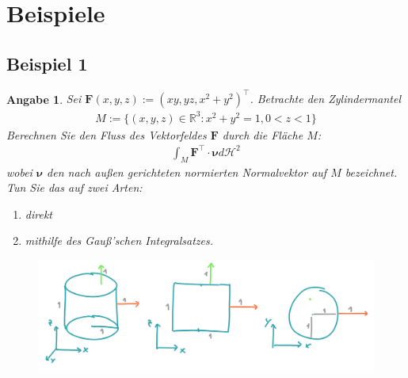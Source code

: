 \documentclass[]{article}
\newtheorem*{angabe*}{Angabe}
\begin{document}
\section{Beispiele}

\subsection*{Beispiel 1}
\begin{angabe*}
	Sei $\bm{F}(x,y,z) := (xy, yz, x^2+y^2)^\top$. Betrachte den Zylindermantel
	\begin{align*}
		M := \{(x,y,z) \in \mathbb{R}^3: x^2+y^2=1, 0<z<1\}
	\end{align*}
	Berechnen Sie den Fluss des Vektorfeldes $\mathbf{F}$ durch die Fläche $M$:
	\begin{align*}
		\int_M \bm{F}^\top \cdot \bm{\nu} d\mathcal{H}^2
	\end{align*}
	wobei $\bm{\nu}$ den nach außen gerichteten normierten Normalvektor auf $M$ bezeichnet.
	Tun Sie das auf zwei Arten:
	\begin{enumerate}[label=(\roman*)]
		\item direkt
		\item mithilfe des Gauß'schen Integralsatzes.
	\end{enumerate}
\end{angabe*}

\begin{figure}[h!]
	\center
	\includegraphics[width=\columnwidth]{bsp_1.png}
\end{figure}
\end{document}
